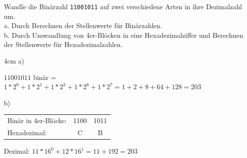 \question[3]
Wandle die Binärzahl \texttt{11001011} auf zwei verschiedene Arten in
ihre Dezimalzahl um. \\
a. Durch Berechnen der Stellenwerte für Binärzahlen. \\
b. Durch Umwandlung von 4er-Blöcken in eine Hexadezimalziffer und Berechnen der Stellenwerte
für Hexadezimalzahlen. \\

\begin{solutionbox}{4cm}
a)

$11001011$ binär = $1*2^0 + 1*2^1 + 1*2^3 + 1*2^6 + 1*2^7
 =  1 + 2 + 8 + 64 + 128 = 203$

b)

\begin{tabular}{@{}l c c@{}}
Binär in 4er-Blöcke: & 1100 & 1011 \\
Hexadezimal:         & C    & B    \\
\end{tabular}


Dezimal: $11*16^0 + 12*16^1 = 11 + 192 = 203$
\end{solutionbox}
